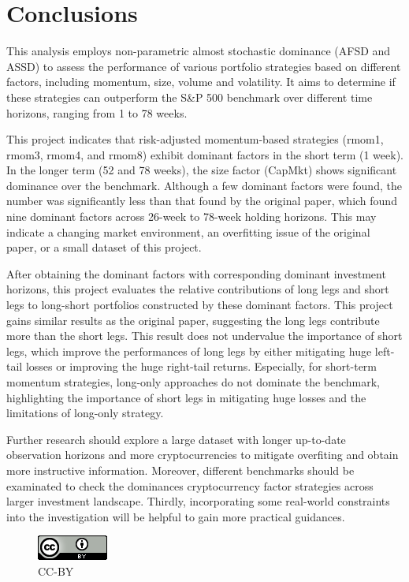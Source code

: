 \documentclass{article}
\begin{document}
\hypertarget{conclusions}{%
\section{Conclusions}\label{conclusions}}

This analysis employs non-parametric almost stochastic dominance (AFSD and ASSD) to assess the performance of various portfolio strategies based on different factors, including momentum, size, volume and volatility. It aims to determine if these strategies can outperform the S\&P 500 benchmark over different time horizons, ranging from 1 to 78 weeks. 

This project indicates that risk-adjusted momentum-based strategies (rmom1, rmom3, rmom4, and rmom8) exhibit dominant factors in the short term (1 week). In the longer term (52 and 78 weeks), the size factor (CapMkt) shows significant dominance over the benchmark. Although a few dominant factors were found, the number was significantly less than that found by the original paper, which found nine dominant factors across 26-week to 78-week holding horizons. This may indicate a changing market environment, an overfitting issue of the original paper, or a small dataset of this project.

After obtaining the dominant factors with corresponding dominant investment horizons, this project evaluates the relative contributions of long legs and short legs to long-short portfolios constructed by these dominant factors. This project gains similar results as the original paper, suggesting the long legs contribute more than the short legs. This result does not undervalue the importance of short legs, which improve the performances of long legs by either mitigating huge left-tail losses or improving the huge right-tail returns.  Especially, for short-term momentum strategies, long-only approaches do not dominate the benchmark, highlighting the importance of short legs in mitigating huge losses and the limitations of long-only strategy.

Further research should explore a large dataset with longer up-to-date observation horizons and more cryptocurrencies to mitigate overfiting and obtain more instructive information. Moreover, different benchmarks should be examinated to check the dominances cryptocurrency factor strategies across larger investment landscape. Thirdly, incorporating some real-world constraints into the investigation will be helpful to gain more practical guidances. 


\newpage

\begin{figure}
\centering
\includegraphics{cc_by_88x31.png}
\caption{CC-BY}
\end{figure}

\nocite{*}
\printbibliography[notkeyword=ignore]
\end{document}
